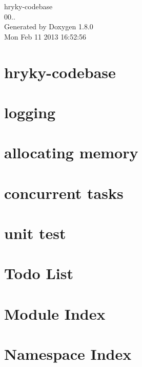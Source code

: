 \documentclass{book}
\begin{document}
\hypersetup{pageanchor=false,citecolor=blue}
\begin{titlepage}
\vspace*{7cm}
\begin{center}
{\Large hryky-\/codebase \\[1ex]\large 00.. }\\
\vspace*{1cm}
{\large Generated by Doxygen 1.8.0}\\
\vspace*{0.5cm}
{\small Mon Feb 11 2013 16:52:56}\\
\end{center}
\end{titlepage}
\clearemptydoublepage
{}
\tableofcontents
\clearemptydoublepage
{}
\hypersetup{pageanchor=true,citecolor=blue}
\chapter{hryky-\/codebase}
\label{index}\hypertarget{index}{}
\chapter{logging}
\label{hryky::log}
\hypertarget{hryky::log}{}

\chapter{allocating memory}
\label{hryky::memory}
\hypertarget{hryky::memory}{}

\chapter{concurrent tasks}
\label{hryky::task}
\hypertarget{hryky::task}{}

\chapter{unit test}
\label{hryky::testing}
\hypertarget{hryky::testing}{}

\chapter{Todo List}
\label{todo}
\hypertarget{todo}{}

\chapter{Module Index}

\chapter{Namespace Index}

\end{document}
